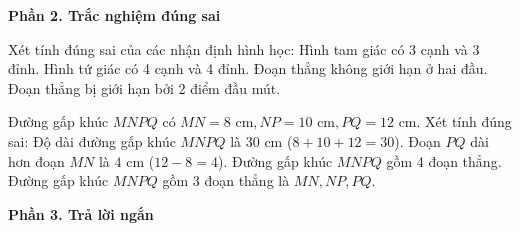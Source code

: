 \textbf{Phần 2. Trắc nghiệm đúng sai}

\begin{ex} %
Xét tính đúng sai của các nhận định hình học:
\choiceTF
{\True Hình tam giác có 3 cạnh và 3 đỉnh.}
{\True Hình tứ giác có 4 cạnh và 4 đỉnh.}
{Đoạn thẳng không giới hạn ở hai đầu.}
{\True Đoạn thẳng bị giới hạn bởi 2 điểm đầu mút.}
\end{ex}

\begin{ex} %
Đường gấp khúc $MNPQ$ có $MN = 8\text{ cm}, NP = 10\text{ cm}, PQ = 12\text{ cm}$. Xét tính đúng sai:
\choiceTF
{\True Độ dài đường gấp khúc $MNPQ$ là $30\text{ cm}$ ($8 + 10 + 12 = 30$).}
{\True Đoạn $PQ$ dài hơn đoạn $MN$ là $4\text{ cm}$ ($12 - 8 = 4$).}
{Đường gấp khúc $MNPQ$ gồm 4 đoạn thẳng.}
{\True Đường gấp khúc $MNPQ$ gồm 3 đoạn thẳng là $MN, NP, PQ$.}
\end{ex}

\textbf{Phần 3. Trả lời ngắn}

